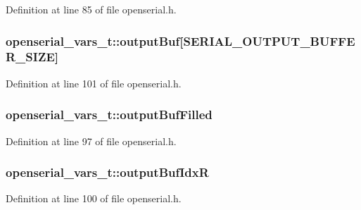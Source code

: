Definition at line 85 of file openserial.\+h.

\subsubsection[{\texorpdfstring{output\+Buf}{outputBuf}}]{ openserial\+\_\+vars\+\_\+t\+::output\+Buf\mbox{[}{\bf S\+E\+R\+I\+A\+L\+\_\+\+O\+U\+T\+P\+U\+T\+\_\+\+B\+U\+F\+F\+E\+R\+\_\+\+S\+I\+ZE}\mbox{]}}\hypertarget{structopenserial__vars__t_a3f88c7c284a6a3dce9bb67ced44a9da3}{}\label{structopenserial__vars__t_a3f88c7c284a6a3dce9bb67ced44a9da3}


Definition at line 101 of file openserial.\+h.

\subsubsection[{\texorpdfstring{output\+Buf\+Filled}{outputBufFilled}}]{ openserial\+\_\+vars\+\_\+t\+::output\+Buf\+Filled}\hypertarget{structopenserial__vars__t_ac1d8a23992e69cea511d5336e2d04df4}{}\label{structopenserial__vars__t_ac1d8a23992e69cea511d5336e2d04df4}


Definition at line 97 of file openserial.\+h.

\subsubsection[{\texorpdfstring{output\+Buf\+IdxR}{outputBufIdxR}}]{ openserial\+\_\+vars\+\_\+t\+::output\+Buf\+IdxR}\hypertarget{structopenserial__vars__t_a1f210c5c7efe803f967a9f152f700c6f}{}\label{structopenserial__vars__t_a1f210c5c7efe803f967a9f152f700c6f}


Definition at line 100 of file openserial.\+h.

